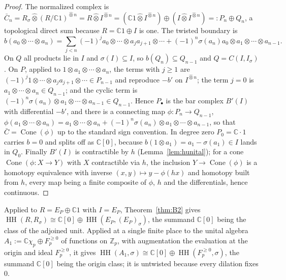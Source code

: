 \documentclass[11pt]{amsart}
\theoremstyle{definition}
\theoremstyle{remark}
\newcommand{\C}{\mathbb C}
\newcommand{\Z}{\mathbb Z}
\newcommand{\Cone}{\operatorname{Cone}}
\newcommand{\HH}{\operatorname{HH}}
\begin{document}
\begin{proof}
The normalized complex is
$\bar C_n=R_{\sigma}\widehat\otimes(R/\C1)^{\widehat\otimes n}
=R\widehat\otimes I^{\widehat\otimes n}
=(\C1\widehat\otimes I^{\widehat\otimes n})\oplus
(I\widehat\otimes I^{\widehat\otimes n})=:P_n\oplus Q_n$, a topological direct
sum because $R=\C1\oplus I$ is one.  The twisted boundary is
\[
b(a_0\otimes\cdots\otimes a_n)=\sum_{j<n}(-1)^{j}a_0\otimes\cdots\otimes
a_ja_{j+1}\otimes\cdots+(-1)^{n}\sigma(a_n)a_0\otimes a_1\otimes\cdots\otimes
a_{n-1}.
\]
On $Q$ all products lie in $I$ and $\sigma(I)\subseteq I$, so $b(Q_n)\subseteq Q_{n-1}$ and
$Q=C(I,I_{\sigma})$.  On $P$, applied to $1\otimes a_1\otimes\cdots\otimes
a_n$, the terms with $j\ge1$ are
$(-1)^{j}1\otimes\cdots\otimes a_ja_{j+1}\otimes\cdots\in P_{n-1}$ and
reproduce $-b'$ on $I^{\widehat\otimes n}$; the term $j=0$ is
$a_1\otimes\cdots\otimes a_n\in Q_{n-1}$; and the cyclic term is
$(-1)^{n}\sigma(a_n)\otimes a_1\otimes\cdots\otimes a_{n-1}\in Q_{n-1}$.  Hence
$P_{\bullet}$ is the bar complex $B'(I)$ with differential $-b'$, and there is
a connecting map $\phi:P_n\to Q_{n-1}$,
$\phi(a_1\otimes\cdots\otimes a_n)=a_1\otimes\cdots\otimes a_n+
(-1)^{n}\sigma(a_n)\otimes a_1\otimes\cdots\otimes a_{n-1}$, so that
$\bar C=\Cone(\phi)$ up to the standard sign convention.  In degree zero
$P_0=\C\cdot1$ carries $b=0$ and splits off as $\C[0]$, because
$b(1\otimes a_1)=a_1-\sigma(a_1)\in I$ lands in $Q_0$.  Finally $B'(I)$ is
contractible by $h$ (Lemma~\ref{lem:hunital}); for a cone $\Cone(\phi:X\to Y)$
with $X$ contractible via $h$, the inclusion $Y\to\Cone(\phi)$ is a homotopy
equivalence with inverse $(x,y)\mapsto y-\phi(hx)$ and homotopy built from $h$,
every map being a finite composite of $\phi$, $h$ and the differentials, hence
continuous.
\end{proof}

Applied to $R=E_P\oplus\C1$ with $I=E_P$, Theorem~\ref{thm:B2} gives
$\HH(R,R_{\sigma})\cong\C[0]\oplus\HH(E_P,(E_P)_{\sigma})$, the summand $\C[0]$
being the class of the adjoined unit.  Applied at a single finite place to the
unital algebra $A_1:=\C\chi_p\oplus F_p^{\ge0}$ of functions on $\Z_p$, with
augmentation the evaluation at the origin and ideal $F_p^{\ge0}$, it gives
$\HH(A_1,\sigma)\cong\C[0]\oplus\HH(F_p^{\ge0},\sigma)$, the summand $\C[0]$
being the origin class; it is untwisted because every dilation fixes $0$.
\end{document}
